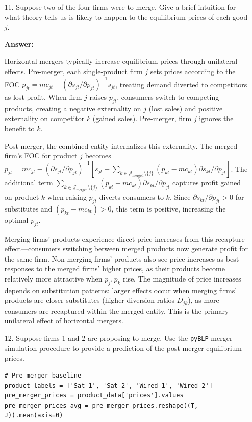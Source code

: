 \documentclass[english,11pt]{article}
\begin{document}
\begin{enumerate}
\item[11.] Suppose two of the four firms were to merge. Give a brief
intuition for what theory tells us is likely to happen to the equilibrium
prices of each good $j$.

\textbf{Answer:}

Horizontal mergers typically increase equilibrium prices through unilateral effects. Pre-merger, each single-product firm $j$ sets prices according to the FOC $p_{jt} = mc_{jt} - (\partial s_{jt}/\partial p_{jt})^{-1} s_{jt}$, treating demand diverted to competitors as lost profit. When firm $j$ raises $p_{jt}$, consumers switch to competing products, creating a negative externality on $j$ (lost sales) and positive externality on competitor $k$ (gained sales). Pre-merger, firm $j$ ignores the benefit to $k$.

Post-merger, the combined entity internalizes this externality. The merged firm's FOC for product $j$ becomes $p_{jt} = mc_{jt} - (\partial s_{jt}/\partial p_{jt})^{-1} [s_{jt} + \sum_{k \in \mathcal{J}_{\text{merged}} \setminus \{j\}} (p_{kt} - mc_{kt}) \partial s_{kt}/\partial p_{jt}]$. The additional term $\sum_{k \in \mathcal{J}_{\text{merged}} \setminus \{j\}} (p_{kt} - mc_{kt}) \partial s_{kt}/\partial p_{jt}$ captures profit gained on product $k$ when raising $p_{jt}$ diverts consumers to $k$. Since $\partial s_{kt}/\partial p_{jt} > 0$ for substitutes and $(p_{kt} - mc_{kt}) > 0$, this term is positive, increasing the optimal $p_{jt}$.

Merging firms' products experience direct price increases from this recapture effect---consumers switching between merged products now generate profit for the same firm. Non-merging firms' products also see price increases as best responses to the merged firms' higher prices, as their products become relatively more attractive when $p_j, p_k$ rise. The magnitude of price increases depends on substitution patterns: larger effects occur when merging firms' products are closer substitutes (higher diversion ratios $D_{jk}$), as more consumers are recaptured within the merged entity. This is the primary unilateral effect of horizontal mergers.

\item[12.] Suppose firms 1 and 2 are proposing to merge. Use the \texttt{pyBLP}
merger simulation procedure to provide a prediction of the post-merger
equilibrium prices.

\begin{verbatim}
# Pre-merger baseline
product_labels = ['Sat 1', 'Sat 2', 'Wired 1', 'Wired 2']
pre_merger_prices = product_data['prices'].values
pre_merger_prices_avg = pre_merger_prices.reshape((T, J)).mean(axis=0)


\end{verbatim}
\end{enumerate}
\end{document}
